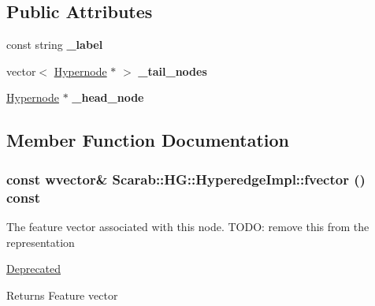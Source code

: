 \subsection*{Public Attributes}
\begin{DoxyCompactItemize}
\item 
\hypertarget{class_scarab_1_1_h_g_1_1_hyperedge_impl_ab14180934c56806b0004bcbdac9eef88}{
const string {\bfseries \_\-label}}
\label{class_scarab_1_1_h_g_1_1_hyperedge_impl_ab14180934c56806b0004bcbdac9eef88}

\item 
\hypertarget{class_scarab_1_1_h_g_1_1_hyperedge_impl_a70fab435c66aab79825aab6b9058cda5}{
vector$<$ \hyperlink{class_scarab_1_1_h_g_1_1_hypernode}{Hypernode} $\ast$ $>$ {\bfseries \_\-tail\_\-nodes}}
\label{class_scarab_1_1_h_g_1_1_hyperedge_impl_a70fab435c66aab79825aab6b9058cda5}

\item 
\hypertarget{class_scarab_1_1_h_g_1_1_hyperedge_impl_a92aeb9593a64be769f18666c3bfd0a20}{
\hyperlink{class_scarab_1_1_h_g_1_1_hypernode}{Hypernode} $\ast$ {\bfseries \_\-head\_\-node}}
\label{class_scarab_1_1_h_g_1_1_hyperedge_impl_a92aeb9593a64be769f18666c3bfd0a20}

\end{DoxyCompactItemize}


\subsection{Member Function Documentation}
\hypertarget{class_scarab_1_1_h_g_1_1_hyperedge_impl_a359446c285164a93995bb87e6ea74882}{
\subsubsection[{fvector}]{\setlength{\rightskip}{0pt plus 5cm}const wvector\& Scarab::HG::HyperedgeImpl::fvector () const}}
\label{class_scarab_1_1_h_g_1_1_hyperedge_impl_a359446c285164a93995bb87e6ea74882}
The feature vector associated with this node. TODO: remove this from the representation \begin{Desc}
\item[\hyperlink{deprecated__deprecated000005}{Deprecated}]\end{Desc}
\begin{DoxyReturn}{Returns}
Feature vector 
\end{DoxyReturn}


